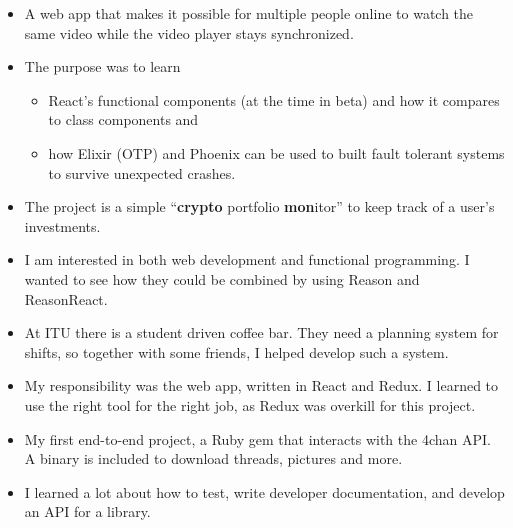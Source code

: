 \begin{itemize}
  \item A web app that makes it possible for multiple people online to watch the
  same video while the video player stays synchronized.
  \item The purpose was to learn
  \begin{itemize}
    \item React's functional components (at the time in beta) and how
    it compares to class components and
    \item how Elixir (OTP) and Phoenix can be used to built fault tolerant
    systems to survive unexpected crashes.
  \end{itemize}
\end{itemize}
\begin{itemize}
  \item The project is a simple ``\textbf{crypto} portfolio \textbf{mon}itor''
  to keep track of a user's investments.
  \item I am interested in both web development and functional programming. I
  wanted to see how they could be combined by using Reason and ReasonReact.
\end{itemize}
\smallskip
\smallskip
{}
\begin{itemize}
  \item At ITU there is a student driven coffee bar. They need a planning system
  for shifts, so together with some friends, I helped develop such a system.
  \item My responsibility was the web app, written in React and Redux. I learned
  to use the right tool for the right job, as Redux was overkill for this
  project.
\end{itemize}
\smallskip
\smallskip
{}
\begin{itemize}
  \item My first end-to-end project, a Ruby gem that interacts with the 4chan
  API. A binary is included to download threads, pictures and more.
  \item I learned a lot about how to test, write developer documentation, and
  develop an API for a library.
\end{itemize}
